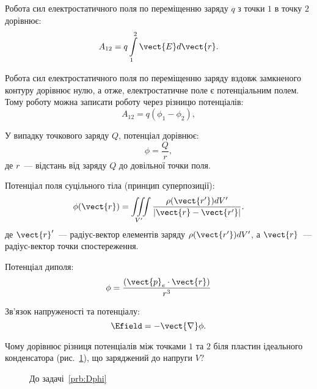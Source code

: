  \begin{Theory}\small
	Робота сил електростатичного поля по переміщенню заряду $q$ з точки $1$ в точку $2$ дорівнює:
	\begin{equation}\label{work}
		A_{12} = q\int\limits_1^2 \vect{E}d\vect{r}.
	\end{equation}

	Робота сил електростатичного поля по переміщенню заряду вздовж замкненого контуру дорівнює нулю, а отже, електростатичне поле є потенціальним полем. Тому роботу можна записати роботу через різницю потенціалів:
	\begin{equation}\label{work_potential}
		A_{12} = q(\phi_1 - \phi_2),
	\end{equation}

	У випадку точкового заряду $Q$, потенціал дорівнює:
	\begin{equation}\label{pot_point}
	\phi = \frac{Q}{r},
	\end{equation}
	де $r$~--- відстань від заряду $Q$ до довільної точки поля.

  Потенціал поля суцільного тіла (принцип суперпозиції):
  \begin{equation}\label{Supperposition_principle}
	  \phi(\vect{r}) = \iiint\limits_{V'} \frac{\rho(\vect{r'}) dV'}{\left| \vect{r} - \vect{r'} \right|}.
  \end{equation}
  де $\vect{r}'$~--- радіус-вектор елементів заряду $\rho(\vect{r'}) dV'$, а $\vect{r}$~--- радіус-вектор точки спостереження.
	
Потенціал диполя:
	\begin{equation}\label{electric_dipole_potential}
		\phi = \frac{\left( \vect{p}_e\cdot \vect{r}\right) }{r^3}
	\end{equation}

  Зв'язок напруженості та потенціалу:
  \begin{equation}\label{E-phi}
	  \Efield = - \vect{\nabla}\phi.
  \end{equation}
\end{Theory}

\begin{problem}\label{prb:Dphi}
    Чому дорівнює різниця потенціалів між точками $1$ та $2$ біля пластин ідеального конденсатора (рис.~\ref{Dphi}), що заряджений до напруги $V$?

\end{problem}

\begin{figure}[h!]\centering
\caption{До задачі~\ref{prb:Dphi}}
\label{Dphi}
\end{figure}


